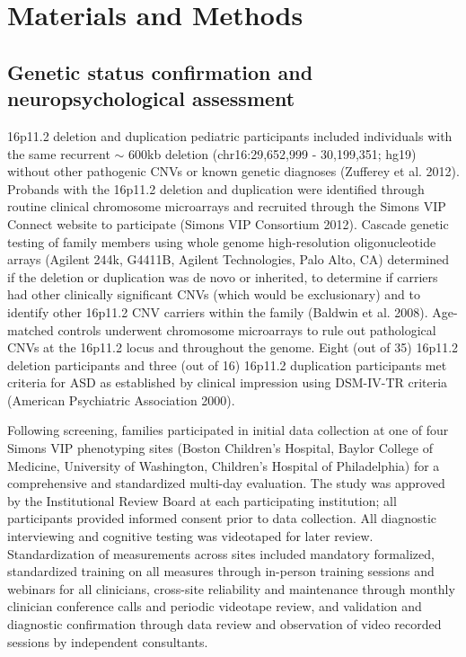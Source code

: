 \documentclass{article}
\begin{document}
\medskip

\section{Materials and Methods}

\subsection{Genetic status confirmation and neuropsychological assessment}

16p11.2 deletion and duplication pediatric participants included individuals with the same recurrent $\sim$ 600kb deletion (chr16:29,652,999 - 30,199,351; hg19) without other pathogenic CNVs or known genetic diagnoses (Zufferey et al. 2012).  Probands with the 16p11.2 deletion and duplication were identified through routine clinical chromosome microarrays and recruited through the Simons VIP Connect website to participate (Simons VIP Consortium 2012).  Cascade genetic testing of family members using whole genome high-resolution oligonucleotide arrays (Agilent 244k, G4411B, Agilent Technologies, Palo Alto, CA) determined if the deletion or duplication was de novo or inherited, to determine if carriers had other clinically significant CNVs (which would be exclusionary) and to identify other 16p11.2 CNV carriers within the family (Baldwin et al. 2008). Age-matched controls underwent chromosome microarrays to rule out pathological CNVs at the 16p11.2 locus and throughout the genome. Eight (out of 35) 16p11.2 deletion participants and three (out of 16) 16p11.2 duplication participants met criteria for ASD as established by clinical impression using DSM-IV-TR criteria (American Psychiatric Association 2000).   

\medskip

Following screening, families participated in initial data collection at one of four Simons VIP phenotyping sites (Boston Children’s Hospital, Baylor College of Medicine, University of Washington, Children’s Hospital of Philadelphia) for a comprehensive and standardized multi-day evaluation.  The study was approved by the Institutional Review Board at each participating institution; all participants provided informed consent prior to data collection. All diagnostic interviewing and cognitive testing was videotaped for later review. Standardization of measurements across sites included mandatory formalized, standardized training on all measures through in-person training sessions and webinars for all clinicians, cross-site reliability and maintenance through monthly clinician conference calls and periodic videotape review, and validation and diagnostic confirmation through data review and observation of video recorded sessions by independent consultants.  
\end{document}
